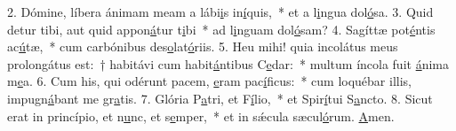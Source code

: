 2. Dómine, líbera ánimam meam a lábi\uline{i}s in\uline{í}quis,~* et a l\uline{i}ngua dol\uline{ó}sa.
3. Quid detur tibi, aut quid appon\uline{á}tur t\uline{i}bi~* ad l\uline{i}nguam dol\uline{ó}sam?
4. Sagíttæ pot\uline{é}ntis ac\uline{ú}tæ,~* cum carbónibus des\uline{o}lat\uline{ó}riis.
5. Heu mihi! quia incolátus meus prolongátus est:~† habitávi cum habit\uline{á}ntibus C\uline{e}dar:~* multum íncola fuit \uline{á}nima m\uline{e}a.
6. Cum his, qui odérunt pacem, \uline{e}ram pac\uline{í}ficus:~* cum loquébar illis, impugn\uline{á}bant me gr\uline{a}tis.
7. Glória P\uline{a}tri, et F\uline{í}lio,~* et Spir\uline{í}tui S\uline{a}ncto.
8. Sicut erat in princípio, et n\uline{u}nc, et s\uline{e}mper,~* et in sǽcula sæcul\uline{ó}rum. \uline{A}men.
